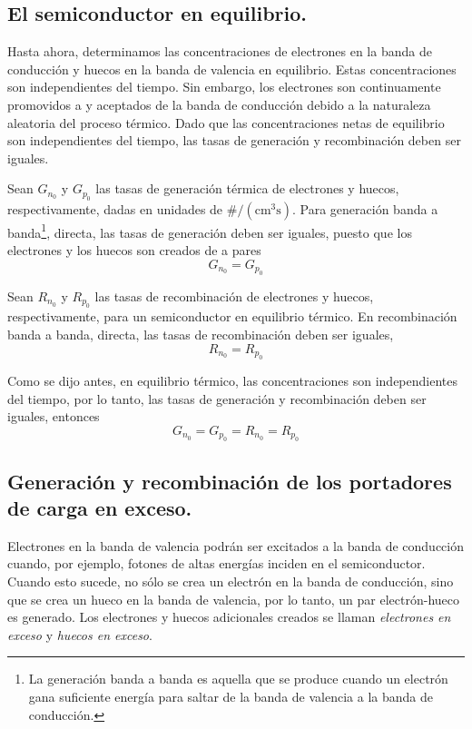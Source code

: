 \documentclass[12pt,a4paper]{article}
\begin{document}
\subsection{El semiconductor en equilibrio.}

Hasta ahora, determinamos las concentraciones de electrones en la banda de conducción y huecos en la banda de valencia en equilibrio. Estas concentraciones son independientes del tiempo. Sin embargo, los electrones son continuamente promovidos a y aceptados de la banda de conducción debido a la naturaleza aleatoria del proceso térmico. Dado que las concentraciones netas de equilibrio son independientes del tiempo, las tasas de generación y recombinación deben ser iguales.

Sean $G_{n_{0}}$ y $G_{p_{0}}$ las tasas de generación térmica de electrones y huecos, respectivamente, dadas en unidades de $\#/(\textrm{cm}^{3}\textrm{s})$. Para generación banda a banda\footnote{La generación banda a banda es aquella que se produce cuando un electrón gana suficiente energía para saltar de la banda de valencia a la banda de conducción.}, directa, las tasas de generación deben ser iguales, puesto que los electrones y los huecos son creados de a pares
\[ G_{n_{0}}=G_{p_{0}} \]

Sean $R_{n_{0}}$ y $R_{p_{0}}$ las tasas de recombinación de electrones y huecos, respectivamente, para un semiconductor en equilibrio térmico. En recombinación banda a banda, directa, las tasas de recombinación deben ser iguales,
\[ R_{n_{0}}=R_{p_{0}} \]

Como se dijo antes, en equilibrio térmico, las concentraciones son independientes del tiempo, por lo tanto, las tasas de generación y recombinación deben ser iguales, entonces
\[ G_{n_{0}}=G_{p_{0}}=R_{n_{0}}=R_{p_{0}} \]

\subsection{Generación y recombinación de los portadores de carga en exceso.}

Electrones en la banda de valencia podrán ser excitados a la banda de conducción cuando, por ejemplo, fotones de altas energías inciden en el semiconductor. Cuando esto sucede, no sólo se crea un electrón en la banda de conducción, sino que se crea un hueco en la banda de valencia, por lo tanto, un par electrón-hueco es generado. Los electrones y huecos adicionales creados se llaman \emph{electrones en exceso} y \emph{huecos en exceso}.
\end{document}
